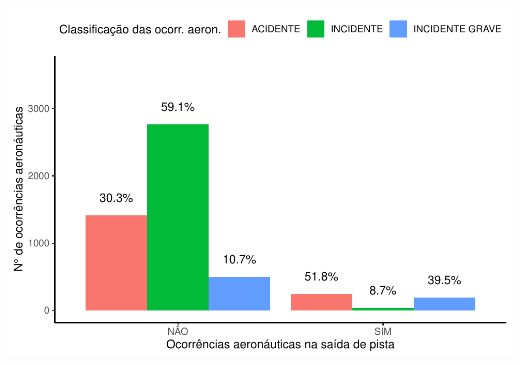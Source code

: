 \documentclass[
]{article}
\begin{document}
\begin{center}\includegraphics[width=1\linewidth]{../4.Relatorio/pdf/index_files/figure-latex/unnamed-chunk-39-1} \end{center}
\end{document}
